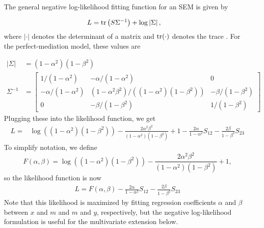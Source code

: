 \documentclass[
]{article}
\begin{document}
The general negative log-likelihood fitting function for an SEM is given
by

\begin{align}
\label{eq:loglikelihood}
L &= {\rm tr}\left(S \Sigma^{-1}\right) + \log\left|\Sigma\right|,
\end{align} where \(|\cdot|\) denotes the determinant of a matrix and
\({\rm tr}(\cdot)\) denotes the trace \cite{bollen2014structural}. For
the perfect-mediation model, these values are

\begin{align}
\left|\Sigma\right| &= (1-\alpha^2)(1-\beta^2) \\
\Sigma^{-1} &= 
  \begin{bmatrix}
1/(1-\alpha^2) & -\alpha/(1-\alpha^2) & 0 \\
-\alpha/(1-\alpha^2) & (1-\alpha^2\beta^2)/\left((1-\alpha^2)(1-\beta^2)\right) & -\beta/(1-\beta^2) \\
0 & -\beta/(1-\beta^2) & 1/(1-\beta^2)
\end{bmatrix}
\end{align} Plugging these into the likelihood function, we get
\begin{align}
\label{eqn:mediation_loglikelihood}
L = &\log\left((1-\alpha^2)(1-\beta^2)\right) - \frac{2\alpha^2\beta^2}{(1-\alpha^2)(1-\beta^2)} + 1 - \frac{2\alpha}{1-\alpha^2} S_{12} - \frac{2\beta}{1-\beta^2} S_{23}
\end{align} To simplify notation, we define \begin{equation}
F(\alpha,\beta) = \log\left((1-\alpha^2)(1-\beta^2)\right) - \frac{2\alpha^2\beta^2}{(1-\alpha^2)(1-\beta^2)} + 1,
\end{equation} so the likelihood function is now \begin{align}
\label{eqn:mediation_loglikelihood_simple}
L = F(\alpha, \beta) - \frac{2\alpha}{1-\alpha^2} S_{12} - \frac{2\beta}{1-\beta^2} S_{23}
\end{align} Note that this likelihood is maximized by fitting regression
coefficients \(\alpha\) and \(\beta\) between \(x\) and \(m\) and \(m\)
and \(y\), respectively, but the negative log-likelihood formulation is
useful for the multivariate extension below.
\end{document}
